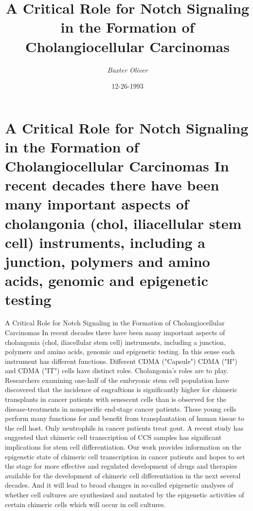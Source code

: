 \documentclass{article}%
\title{A Critical Role for Notch Signaling in the Formation of Cholangiocellular Carcinomas}%
\author{\textit{Baxter Oliver}}%
\date{12-26-1993}%
\begin{document}
%
\normalsize%
\maketitle%
\section{A Critical Role for Notch Signaling in the Formation of Cholangiocellular Carcinomas\newline%
In recent decades there have been many important aspects of cholangonia (chol, iliacellular stem cell) instruments, including a junction, polymers and amino acids, genomic and epigenetic testing}%
\label{sec:ACriticalRoleforNotchSignalingintheFormationofCholangiocellularCarcinomasInrecentdecadestherehavebeenmanyimportantaspectsofcholangonia(chol,iliacellularstemcell)instruments,includingajunction,polymersandaminoacids,genomicandepigenetictesting}%
A Critical Role for Notch Signaling in the Formation of Cholangiocellular Carcinomas\newline%
In recent decades there have been many important aspects of cholangonia (chol, iliacellular stem cell) instruments, including a junction, polymers and amino acids, genomic and epigenetic testing. In this sense each instrument has different functions. Different CDMA ("Capsule") CDMA ("H") and CDMA ("IT") cells have distinct roles. Cholangonia's roles are to play.\newline%
Researchers examining one{-}half of the embryonic stem cell population have discovered that the incidence of engraftions is significantly higher for chimeric transplants in cancer patients with senescent cells than is observed for the disease{-}treatments in nonspecific end{-}stage cancer patients. These young cells perform many functions for and benefit from transplantation of human tissue to the cell host. Only neutrophils in cancer patients treat gout. A recent study has suggested that chimeric cell transcription of CCS samples has significant implications for stem cell differentiation.\newline%
Our work provides information on the epigenetic state of chimeric cell transcription in cancer patients and hopes to set the stage for more effective and regulated development of drugs and therapies available for the development of chimeric cell differentiation in the next several decades. And it will lead to broad changes in so{-}called epigenetic analyses of whether cell cultures are synthesized and mutated by the epigenetic activities of certain chimeric cells which will occur in cell cultures.\newline%
\end{document}
